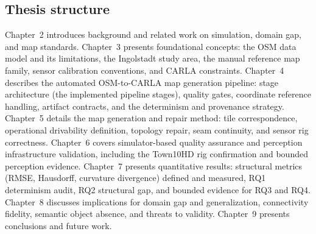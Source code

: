 \subsection{Thesis structure}
Chapter~2 introduces background and related work on simulation, domain gap, and map standards.
Chapter~3 presents foundational concepts: the OSM data model and its limitations, the Ingolstadt study area, the manual reference map family, sensor calibration conventions, and CARLA constraints.
Chapter~4 describes the automated OSM-to-CARLA map generation pipeline: stage architecture (the implemented pipeline stages), quality gates, coordinate reference handling, artifact contracts, and the determinism and provenance strategy.
Chapter~5 details the map generation and repair method: tile correspondence, operational drivability definition, topology repair, seam continuity, and sensor rig correctness.
Chapter~6 covers simulator-based quality assurance and perception infrastructure validation, including the Town10HD rig confirmation and bounded perception evidence.
Chapter~7 presents quantitative results: structural metrics (RMSE, Hausdorff, curvature divergence) defined and measured, RQ1 determinism audit, RQ2 structural gap, and bounded evidence for RQ3 and RQ4.
Chapter~8 discusses implications for domain gap and generalization, connectivity fidelity, semantic object absence, and threats to validity.
Chapter~9 presents conclusions and future work.
